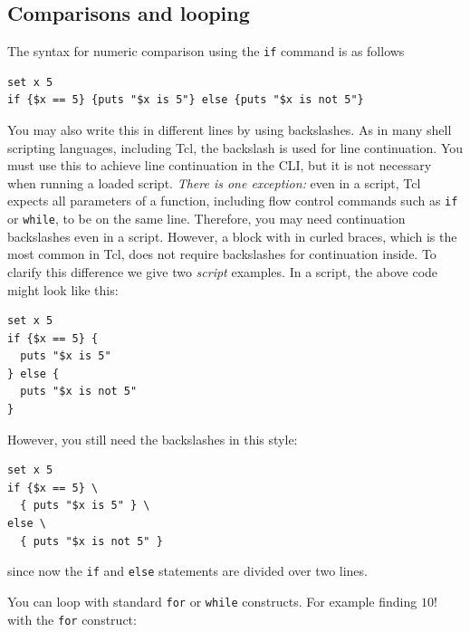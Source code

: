 \documentclass[
paper=a4,                       %
fontsize=11pt,                  %
twoside,                        %
footsepline,                    %
headsepline,                    %
headinclude=false,              %
footinclude=false,              %
pagesize,                       %
]{scrartcl}
\begin{document}
\subsection{Comparisons and looping}

The syntax for numeric comparison using the \lstinline|if| command is as follows 

{\small\vspace{0,2cm}
\begin{lstlisting}[numbers=none]
set x 5
if {$x == 5} {puts "$x is 5"} else {puts "$x is not 5"}
\end{lstlisting}\vspace{0,2cm}
} 
      
\noindent You may also write this in different lines by using backslashes. As in many shell scripting languages, including Tcl, the  backslash is used for line continuation. You must use this to achieve line continuation in the \es{} CLI, but it is not necessary when running a loaded script. \emph{There is one exception:} even in a script, Tcl expects all parameters of a function, including flow control commands such as \texttt{if} or \texttt{while}, to be on the same line. Therefore, you may need continuation backslashes even in a script. However, a block with in curled braces, which is the most common in Tcl, does not require backslashes for continuation inside. To clarify this difference we give two \emph{script} examples. In a script, the above code might look like this: 

{\small\vspace{0,2cm}
\begin{lstlisting}[numbers=none]
set x 5
if {$x == 5} {
  puts "$x is 5"
} else {
  puts "$x is not 5"
}
\end{lstlisting}\vspace{0,2cm}
}

\noindent However, you still need the backslashes in this style:

{\small\vspace{0,2cm}
\begin{lstlisting}[numbers=none]
set x 5
if {$x == 5} \
  { puts "$x is 5" } \
else \
  { puts "$x is not 5" }
\end{lstlisting}\vspace{0,2cm}
}

\noindent since now the \texttt{if} and \texttt{else} statements are divided over two lines.

You can loop with standard \lstinline|for| or \lstinline|while| constructs. For example finding $10!$ with the \lstinline|for| construct:
      
\end{document}
